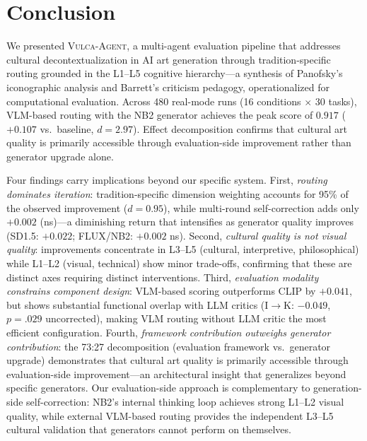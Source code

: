 \documentclass[sigconf, screen, review, anonymous]{acmart}
\newcommand{\system}{\textsc{Vulca-Agent}}
\newcommand{\Lx}[1]{L#1}
\begin{document}
\section{Conclusion}
\label{sec:conclusion}

We presented \system{}, a multi-agent evaluation pipeline that addresses cultural decontextualization in AI art generation through tradition-specific routing grounded in the \Lx{1}--\Lx{5} cognitive hierarchy---a synthesis of Panofsky's iconographic analysis and Barrett's criticism pedagogy, operationalized for computational evaluation.
Across 480 real-mode runs (16 conditions $\times$ 30 tasks), VLM-based routing with the NB2 generator achieves the peak score of $\mathbf{0.917}$ ($+0.107$ vs.\ baseline, $d = 2.97$).
Effect decomposition confirms that cultural art quality is primarily accessible through evaluation-side improvement rather than generator upgrade alone.

Four findings carry implications beyond our specific system.
First, \emph{routing dominates iteration}: tradition-specific dimension weighting accounts for 95\% of the observed improvement ($d = 0.95$), while multi-round self-correction adds only $+0.002$ (ns)---a diminishing return that intensifies as generator quality improves (SD1.5: $+0.022$; FLUX/NB2: $+0.002$ ns).
Second, \emph{cultural quality is not visual quality}: improvements concentrate in \Lx{3}--\Lx{5} (cultural, interpretive, philosophical) while \Lx{1}--\Lx{2} (visual, technical) show minor trade-offs, confirming that these are distinct axes requiring distinct interventions.
Third, \emph{evaluation modality constrains component design}: VLM-based scoring outperforms CLIP by $+0.041$, but shows substantial functional overlap with LLM critics (I$\to$K: $-0.049$, $p = .029$ uncorrected), making VLM routing without LLM critic the most efficient configuration.
Fourth, \emph{framework contribution outweighs generator contribution}: the 73:27 decomposition (evaluation framework vs.\ generator upgrade) demonstrates that cultural art quality is primarily accessible through evaluation-side improvement---an architectural insight that generalizes beyond specific generators.
Our evaluation-side approach is complementary to generation-side self-correction: NB2's internal thinking loop achieves strong \Lx{1}--\Lx{2} visual quality, while external VLM-based routing provides the independent \Lx{3}--\Lx{5} cultural validation that generators cannot perform on themselves.
\end{document}
